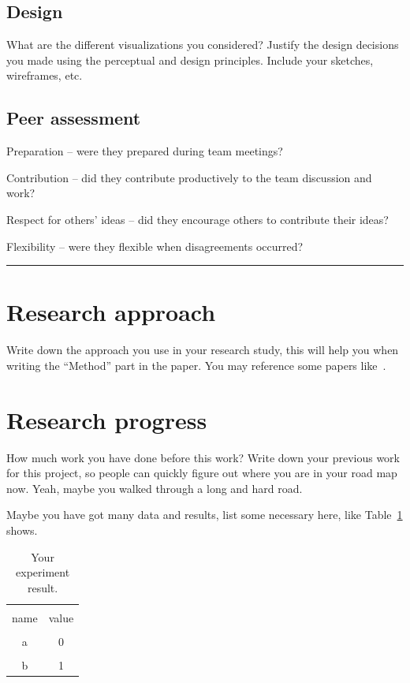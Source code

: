 \documentclass[a4paper]{article}
\begin{document}
\subsection{Design}
What are the different visualizations you considered? Justify the design decisions you made using the perceptual and design principles.
Include your sketches, wireframes, etc.

\subsection{Peer assessment}

Preparation – were they prepared during team meetings?

Contribution – did they contribute productively to the team discussion and work?

Respect for others’ ideas – did they encourage others to contribute their ideas?

Flexibility – were they flexible when disagreements occurred?
\vspace{2cm}
\hrule

\section{Research approach}

Write down the approach you use in your research study, this will help you when writing the ``Method'' part in the paper. You may reference some papers like~\cite{isola2017image}.


\section{Research progress}

How much work you have done before this work? Write down your previous work for this project, so people can quickly figure out where you are in your road map now. Yeah, maybe you walked through a long and hard road.

Maybe you have got many data and results, list some necessary here, like Table~\ref{tab:result} shows.

\begin{table}[hb]
    \centering
    \begin{tabular}{c|c}
        \hline \\
        name & value \\
        \hline \\
        a & 0 \\
        \hline \\
        b & 1 \\
        \hline
    \end{tabular}
    \caption{Your experiment result.}
    \label{tab:result}
\end{table}
\end{document}
